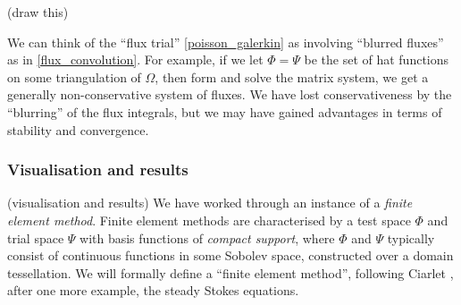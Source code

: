 \documentclass[11pt,a4paper]{memoir}
\begin{document}
\vskip 0.2in
(draw this)
\vskip 0.2in

We can think of the ``flux trial'' \eqref{poisson_galerkin} as involving ``blurred fluxes'' as in \eqref{flux_convolution}.
For example, if we let $\Phi = \Psi$ be the set of hat functions on some triangulation
of $\Omega$, then form and solve the matrix system, we get a generally non-conservative system of fluxes. We have lost conservativeness
by the ``blurring'' of the flux integrals, but we may have gained advantages in terms of stability and convergence.

\subsubsection{Visualisation and results}
\vskip 0.2in
(visualisation and results)
\vskip 0.2in
We have worked through an instance of a \textit{finite element method}.
Finite element methods are characterised by a test space $\Phi$ and trial space
$\Psi$ with basis functions of \textit{compact support}, where $\Phi$ and $\Psi$ typically consist of continuous functions in
some Sobolev space, constructed over a domain tessellation. We will formally define a ``finite element method'', following Ciarlet \cite{ciarlet},
after one more example, the steady Stokes equations.
\end{document}
